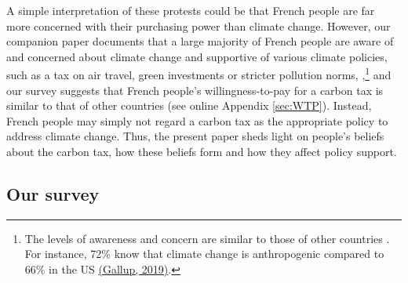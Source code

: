 \documentclass[12pt]{article} %
\begin{document}



A simple interpretation of these protests could be that French people are far more concerned with their purchasing power than climate change. However, our companion paper documents that a large majority of French people are aware of and concerned about climate change and supportive of various climate policies, such as a tax on air travel, green investments or stricter pollution norms, \citep{douenne_french_2019},\footnote{The levels of awareness and concern are similar to those of other countries \citep{stokes_global_2015}. For instance, 72\% know that climate change is anthropogenic compared to 66\% in the US \href{https://news.gallup.com/poll/1615/environment.aspx}{(Gallup, 2019)}.} and our survey suggests that French people’s willingness-to-pay for a carbon tax is similar to that of other countries (see online Appendix \ref{sec:WTP}). Instead, French people may simply not regard a carbon tax as the appropriate policy to address climate change. Thus, the present paper sheds light on people's beliefs about the carbon tax, how these beliefs form and how they affect policy support. %



\subsection{Our survey\label{subsec:Survey-Beliefs-climate}}
\end{document}

